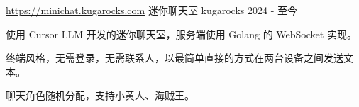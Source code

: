 \begin{cventries}
  \cventry
    {\href{https://minichat.kugarocks.com}{\uline{https://minichat.kugarocks.com}}} %
    {迷你聊天室} %
    {kugarocks} %
    {2024 - 至今} %
    {
      \begin{cvitems} %
        \item {使用 Cursor LLM 开发的迷你聊天室，服务端使用 Golang 的 WebSocket 实现。}
        \item {终端风格，无需登录，无需联系人，以最简单直接的方式在两台设备之间发送文本。}
        \item {聊天角色随机分配，支持小黄人、海贼王。}
      \end{cvitems}
    }

\end{cventries}
